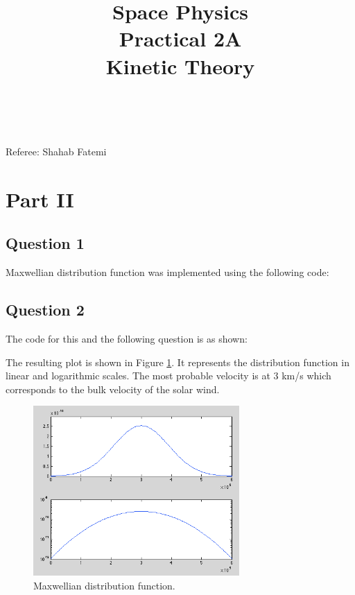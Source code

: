 \documentclass{article}
\title{\textbf {Space Physics} \\ Practical 2A\\ Kinetic Theory} %
\author{\authorivan\\\authoranu}
\begin{document}
\maketitle %

\centerline{Referee: Shahab Fatemi}

\setlength\parindent{0pt} %

\renewcommand{\labelenumi}{\alph{enumi}.} %
\clearpage

\clearpage


\section{Part II}
\subsection{Question 1}
Maxwellian distribution function was implemented using the following code:



\subsection{Question 2}
The code for this and the following question is as shown:


The resulting plot is shown in Figure \ref{fig:plot2}. It represents the distribution function in linear and logarithmic scales. The most probable velocity is at 3 km/s which corresponds to the bulk velocity of the solar wind.
\begin{figure}[h!bt]
\centering
\includegraphics[width=0.7\textwidth]{Figures/plot_2.png}
\caption{Maxwellian distribution function.}
\label{fig:plot2}
\end{figure}
\end{document}
